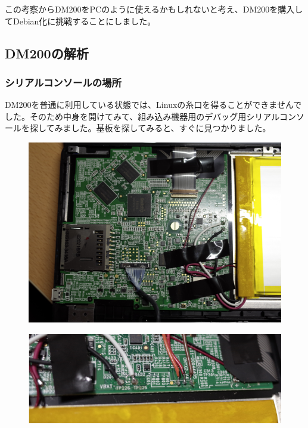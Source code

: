 \documentclass[mingoth,a4paper]{jsarticle}
\begin{document}
この考察からDM200をPCのように使えるかもしれないと考え、DM200を購入してDebian化に挑戦することにしました。


\subsection{DM200の解析}

\subsubsection{シリアルコンソールの場所}

DM200を普通に利用している状態では、Linuxの糸口を得ることができませんでした。そのため中身を開けてみて、組み込み機器用のデバッグ用シリアルコンソールを探してみました。基板を探してみると、すぐに見つかりました。

\begin{figure}[h]
  \begin{center}
    \includegraphics[scale=0.5]{image201709/dm200_board.png}
  \end{center}
\end{figure}


\begin{figure}[h]
  \begin{center}
    \includegraphics[scale=0.5]{image201709/dm200_board_serialconsole}
  \end{center}
\end{figure}
\end{document}
